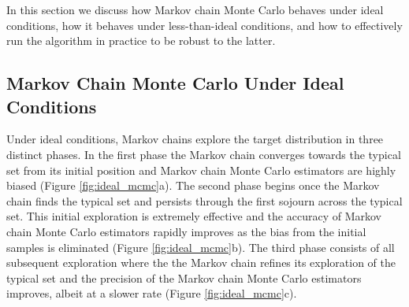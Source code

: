 In this section we discuss how Markov chain Monte Carlo
behaves under ideal conditions, how it behaves under
less-than-ideal conditions, and how to effectively run
the algorithm in practice to be robust to the latter.

\subsection{Markov Chain Monte Carlo Under Ideal Conditions}

Under ideal conditions, Markov chains explore the target
distribution in three distinct phases.  In the first phase the
Markov chain converges towards the typical set from its
initial position and Markov chain Monte Carlo estimators
are highly biased (Figure \ref{fig:ideal_mcmc}a).  The
second phase begins once the Markov chain finds the
typical set and persists through the first sojourn across
the typical set.  This initial exploration is extremely effective
and the accuracy of Markov chain Monte Carlo estimators
rapidly improves as the bias from the initial samples is
eliminated (Figure \ref{fig:ideal_mcmc}b).  The third phase 
consists of all subsequent exploration where the the Markov 
chain refines its exploration of the typical set and the precision 
of the Markov chain Monte Carlo estimators improves, albeit 
at a slower rate (Figure \ref{fig:ideal_mcmc}c).

